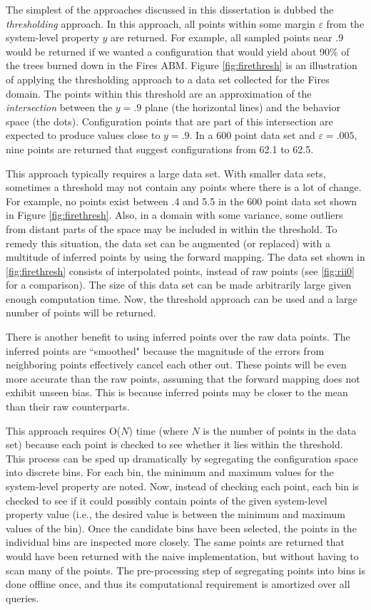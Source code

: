The simplest of the approaches discussed in this dissertation is dubbed the \textit{thresholding} approach.
In this approach, all points within some margin $\varepsilon$ from the system-level property $y$ are returned.
For example, all sampled points near .9 would be returned if we wanted a configuration that would yield about 90\% of the trees burned down in the Fires ABM.
Figure \ref{fig:firethresh} is an illustration of applying the thresholding approach to a data set collected for the Fires domain.
The points within this threshold are an approximation of the \textit{intersection} between the $y=.9$ plane (the horizontal lines) and the behavior space (the dots).
Configuration points that are part of this intersection are expected to produce values close to $y=.9$.
In a 600 point data set and $\varepsilon=.005$, nine points are returned that suggest configurations from 62.1 to 62.5.

This approach typically requires a large data set.
With smaller data sets, sometimes a threshold may not contain any points where there is a lot of change.
For example, no points exist between .4 and 5.5 in the 600 point data set shown in Figure \ref{fig:firethresh}.
Also, in a domain with some variance, some outliers from distant parts of the space may be included in within the threshold.
To remedy this situation, the data set can be augmented (or replaced) with a multitude of inferred points by using the forward mapping.
The data set shown in \ref{fig:firethresh} consists of interpolated points, instead of raw points (see \ref{fig:rii0} for a comparison).
The size of this data set can be made arbitrarily large given enough computation time.
Now, the threshold approach can be used and a large number of points will be returned.

There is another benefit to using inferred points over the raw data points.
The inferred points are ``smoothed" because the magnitude of the errors from neighboring points effectively cancel each other out.
These points will be even more accurate than the raw points, assuming that the forward mapping does not exhibit unseen bias.
This is because inferred points may be closer to the mean than their raw counterparts.

This approach requires O($N$) time (where $N$ is the number of points in the data set) because each point is checked to see whether it lies within the threshold.
This process can be sped up dramatically by segregating the configuration space into discrete bins.
For each bin, the minimum and maximum values for the system-level property are noted.
Now, instead of checking each point, each bin is checked to see if it could possibly contain points of the given system-level property value (i.e., the desired value is between the minimum and maximum values of the bin).
Once the candidate bins have been selected, the points in the individual bins are inspected more closely.
The same points are returned that would have been returned with the naive implementation, but without having to scan many of the points.
The pre-processing step of segregating points into bins is done offline once, and thus its computational requirement is amortized over all queries.

